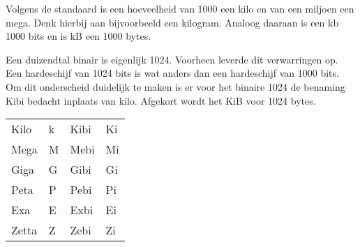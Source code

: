Volgens de standaard is een hoeveelheid van 1000 een kilo en van een miljoen een mega. Denk hierbij aan bijvoorbeeld een kilogram. Analoog daaraan is een kb 1000 bits en is kB een 1000 bytes.

Een duizendtal binair is eigenlijk 1024. Voorheen leverde dit verwarringen op. Een hardeschijf van 1024 bits is wat anders dan een hardeschijf van 1000 bits. Om dit onderscheid duidelijk te maken is er voor het binaire 1024 de benaming Kibi bedacht inplaats van kilo. Afgekort wordt het KiB voor 1024 bytes.

\begin{tabular} { l l l l }
Kilo  & k & Kibi & Ki \\
Mega  & M & Mebi & Mi \\
Giga  & G & Gibi & Gi \\
Peta  & P & Pebi & Pi \\
Exa   & E & Exbi & Ei \\
Zetta & Z & Zebi & Zi \\
\end{tabular}
